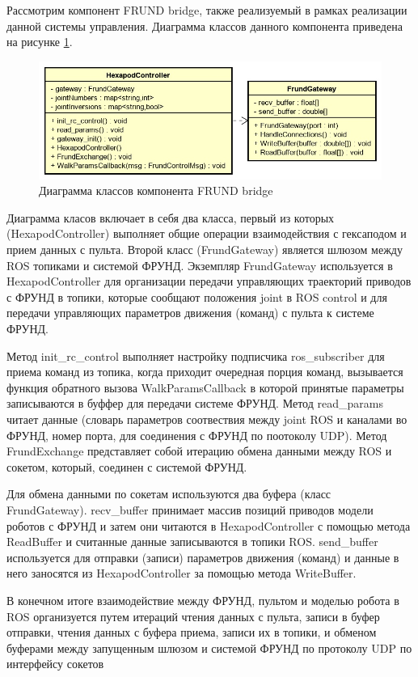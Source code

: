 Рассмотрим компонент FRUND bridge, также реализуемый в рамках реализации данной системы управления.
Диаграмма классов данного компонента приведена на рисунке \ref{img:frundb_class}.

\begin{figure}[h!]
	\centering
	\includegraphics[width = \linewidth]{img/frundb_class}
	\caption{Диаграмма классов компонента FRUND bridge}
	\label{img:frundb_class}
\end{figure}

Диаграмма класов включает в себя два класса, первый из которых (HexapodController) выполняет общие операции взаимодействия с гексаподом и прием данных с пульта. Второй класс (FrundGateway) является шлюзом между ROS топиками и системой ФРУНД. Экземпляр FrundGateway используется в HexapodController для организации передачи управляющих траекторий приводов с ФРУНД в топики, которые сообщают положения joint в ROS control и для передачи управляющих параметров движения (команд) с пульта к системе ФРУНД.

Метод init\_rc\_control выполняет настройку подписчика ros\_subscriber для приема команд из топика, когда приходит очередная порция команд, вызывается функция обратного вызова WalkParamsCallback в которой принятые параметры записываются в буффер для передачи системе ФРУНД. Метод read\_params читает данные (словарь параметров соотвествия между joint ROS и каналами во ФРУНД, номер порта, для соединения с ФРУНД по поотоколу UDP). Метод FrundExchange представляет собой итерацию обмена данными между ROS и сокетом, который, соединен с системой ФРУНД.

Для обмена данными по сокетам используются два буфера (класс FrundGateway). recv\_buffer принимает массив позиций приводов модели роботов с ФРУНД и затем они читаются в HexapodController с помощью метода ReadBuffer и считанные данные записываются в топики ROS. send\_buffer используется для отправки (записи) параметров движения (команд) и данные в него заносятся из HexapodController за помощью метода WriteBuffer.

В конечном итоге взаимодействие между ФРУНД, пультом и моделью робота в ROS организуется путем итераций чтения данных с пульта, записи в буфер отправки, чтения данных с буфера приема, записи их в топики, и обменом буферами между запущенным шлюзом и системой ФРУНД по протоколу UDP по интерфейсу сокетов

